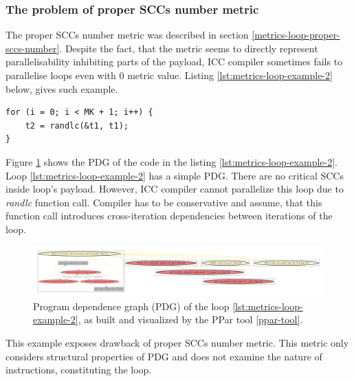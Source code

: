 \subsubsection{The problem of proper SCCs number metric}
\qquad The proper SCCs number metric was described in section \ref{metrics-loop-proper-sccs-number}. Despite the fact, that the metric seems to directly represent parallelisability inhibiting parts of the payload, ICC compiler sometimes fails to parallelise loops even with 0 metric value. Listing \ref{lst:metrics-loop-example-2} below, gives such example.
\begin{lstlisting}[float,floatplacement=H,caption={Loop, under question. Its parallelizability depends on things happening inside randlc() function. Intel compiler does not parallelize it, since it has to be conservative.}, captionpos=b, label=lst:metrics-loop-example-2]
for (i = 0; i < MK + 1; i++) {
	t2 = randlc(&t1, t1);
}
\end{lstlisting}
Figure \ref{metrics-example-loop-2-pdg} shows the PDG of the code in the listing \ref{lst:metrics-loop-example-2}. Loop \ref{lst:metrics-loop-example-2} has a simple PDG. There are no critical SCCs inside loop's payload. However, ICC compiler cannot parallelize this loop due to \textit{randlc} function call. Compiler has to be conservative and assume, that this function call introduces cross-iteration dependencies between iterations of the loop.\newline   
\begin{figure}[htb]
\centering
\includegraphics[width=\linewidth]{figs/metrics-example-loop-2-pdg.pdf}
\caption{Program dependence graph (PDG) of the loop \ref{lst:metrics-loop-example-2}, as built and visualized by the PPar tool \ref{ppar-tool}.}
\label{metrics-example-loop-2-pdg}
\end{figure}
\null\qquad This example exposes drawback of proper SCCs number metric. This metric only considers structural properties of PDG and does not examine the nature of instructions, constituting the loop. 

